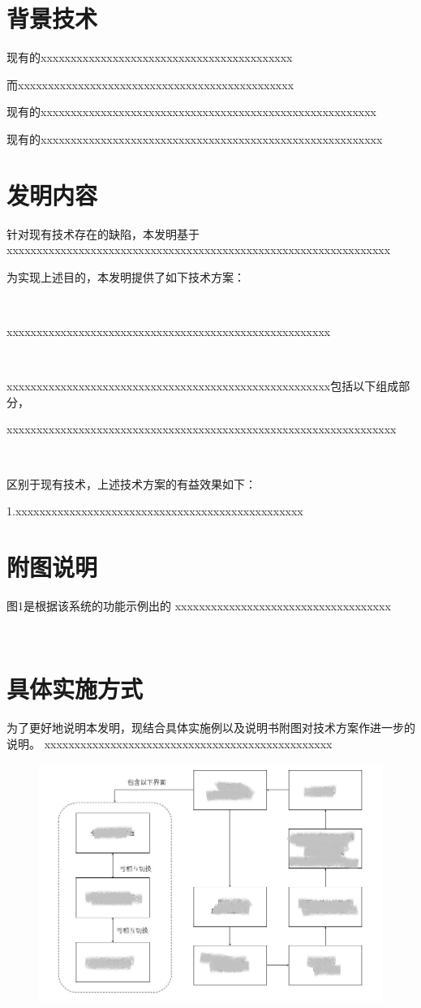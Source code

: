 \documentclass[12pt]{article}
\begin{document}
\section*{背景技术}
现有的xxxxxxxxxxxxxxxxxxxxxxxxxxxxxxxxxxxxxxxxxx

而xxxxxxxxxxxxxxxxxxxxxxxxxxxxxxxxxxxxxxxxxxxxxx

现有的xxxxxxxxxxxxxxxxxxxxxxxxxxxxxxxxxxxxxxxxxxxxxxxxxxxxxxxx

现有的xxxxxxxxxxxxxxxxxxxxxxxxxxxxxxxxxxxxxxxxxxxxxxxxxxxxxxxxx

\section*{发明内容}
针对现有技术存在的缺陷，本发明基于
xxxxxxxxxxxxxxxxxxxxxxxxxxxxxxxxxxxxxxxxxxxxxxxxxxxxxxxxxxxxxxxx

为实现上述目的，本发明提供了如下技术方案：

~

xxxxxxxxxxxxxxxxxxxxxxxxxxxxxxxxxxxxxxxxxxxxxxxxxxxxxx

~

xxxxxxxxxxxxxxxxxxxxxxxxxxxxxxxxxxxxxxxxxxxxxxxxxxxxxx包括以下组成部分，

xxxxxxxxxxxxxxxxxxxxxxxxxxxxxxxxxxxxxxxxxxxxxxxxxxxxxxxxxxxxxxxxx

~

区别于现有技术，上述技术方案的有益效果如下：

1.xxxxxxxxxxxxxxxxxxxxxxxxxxxxxxxxxxxxxxxxxxxxxxxx

\newpage
\section*{附图说明}
图1是根据该系统的功能示例出的
xxxxxxxxxxxxxxxxxxxxxxxxxxxxxxxxxxxx

~

\section*{具体实施方式}
为了更好地说明本发明，现结合具体实施例以及说明书附图对技术方案作进一步的说明。
xxxxxxxxxxxxxxxxxxxxxxxxxxxxxxxxxxxxxxxxxxxxxxxx

\newpage
\begin{figure}[hbtp]
	\centering
	\includegraphics[width=16cm]{功能框图v2.jpg}
	\caption{}
\end{figure}
\end{document}
